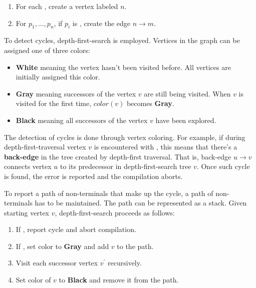 \begin{enumerate}
\item
For each \NtDefinitionN[n], create a vertex labeled $n$.
\item
For $p_1, ..., p_n$, if $p_i$ is \NtDefinitionN[m], create the edge $n\rightarrow m$.
\end{enumerate}


To detect cycles, depth-first-search is employed. Vertices in the graph can be assigned one of three colors:

\begin{itemize}
\item

\textbf{White} meaning the vertex hasn't been visited before. All vertices are initially assigned this color.

\item
\textbf{Gray} meaning successors of the vertex $v$ are still being visited. When $v$ is visited for the first time, $color(v)$ becomes \textbf{Gray}.
\item
\textbf{Black} meaning all successors of the vertex $v$ have been explored.
\end{itemize}



The detection of cycles is done through vertex coloring. For example, if during depth-first-traversal vertex $v$ is encountered with , this means that there's a \textbf{back-edge} in the tree created by depth-first traversal. That is, back-edge $u \rightarrow v$ connects vertex $u$ to its predecessor in depth-first-search tree $v$. Once such cycle is found, the error is reported and the compilation aborts.

To report a path of non-terminals that make up the cycle, a path of non-terminals has to be maintained. The path can be represented as a stack. Given starting vertex $v$, depth-first-search proceeds as follows:

\begin{enumerate}
\item If , report cycle and abort compilation.
\item If , set color to \textbf{Gray} and add $v$ to the path.
\item Visit each successor vertex $v^{\prime}$ recursively.
\item Set color of $v$ to \textbf{Black} and remove it from the path.
\end{enumerate}

